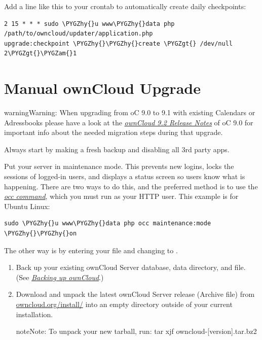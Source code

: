 \documentclass[letterpaper,10pt,english]{sphinxmanual}
\def\PYGZam{\char`\&}
\def\PYGZgt{\char`\>}
\def\PYGZhy{\char`\-}
\begin{document}
Add a line like this to your crontab to automatically create daily
checkpoints:

\begin{Verbatim}[commandchars=\\\{\}]
2 15 * * * sudo \PYGZhy{}u www\PYGZhy{}data php /path/to/owncloud/updater/application.php
upgrade:checkpoint \PYGZhy{}\PYGZhy{}create \PYGZgt{} /dev/null 2\PYGZgt{}\PYGZam{}1
\end{Verbatim}


\section{Manual ownCloud Upgrade}
\label{maintenance/manual_upgrade:manual-owncloud-upgrade}\label{maintenance/manual_upgrade::doc}
\begin{notice}{warning}{Warning:}
When upgrading from oC 9.0 to 9.1 with existing Calendars or Adressbooks
please have a look at the {\hyperref[release_notes::doc]{\emph{\emph{ownCloud 9.2 Release Notes}}}} of oC 9.0 for important info
about the needed migration steps during that upgrade.
\end{notice}

Always start by making a fresh backup and disabling all 3rd party apps.

Put your server in maintenance mode. This prevents new logins, locks the
sessions of logged-in users, and displays a status screen so users know what is
happening. There are two ways to do this, and the preferred method is to use the
{\hyperref[configuration_server/occ_command::doc]{\emph{\emph{occ command}}}}, which you must run as
your HTTP user. This example is for Ubuntu Linux:

\begin{Verbatim}[commandchars=\\\{\}]
sudo \PYGZhy{}u www\PYGZhy{}data php occ maintenance:mode \PYGZhy{}\PYGZhy{}on
\end{Verbatim}

The other way is by entering your  file and changing
 to .
\begin{enumerate}
\item {} 
Back up your existing ownCloud Server database, data directory, and
 file. (See {\hyperref[maintenance/backup::doc]{\emph{\emph{Backing up ownCloud}}}}.)

\item {} 
Download and unpack the latest ownCloud Server release (Archive file) from
\href{https://owncloud.org/install/}{owncloud.org/install/} into an empty directory outside
of your current installation.

\begin{notice}{note}{Note:}
To unpack your new tarball, run:
tar xjf owncloud-{[}version{]}.tar.bz2
\end{notice}

\end{enumerate}
\end{document}
